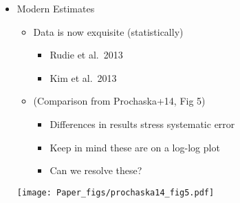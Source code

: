 \documentclass[12pt,letterpaper]{article}
\begin{document}
\begin{Aenumerate}
\begin{itemize}
\begin{itemize}
 	\item Modern Estimates
 		\begin{itemize}
 		\item Data is now exquisite (statistically)
 			\begin{itemize}
 			\item Rudie et al.\ 2013
	 		\item Kim et al.\ 2013
 			\end{itemize}
 		\item (Comparison from Prochaska+14, Fig 5)
 			\begin{itemize}
 			\item Differences in results stress systematic error
 			\item Keep in mind these are on a log-log plot
 			\item Can we resolve these?
 			\end{itemize}
 		\end{itemize}

	\texttt{[image: Paper\_figs/prochaska14\_fig5.pdf]}

 	\end{itemize}
 \end{itemize}


\end{Aenumerate}
\end{document}
